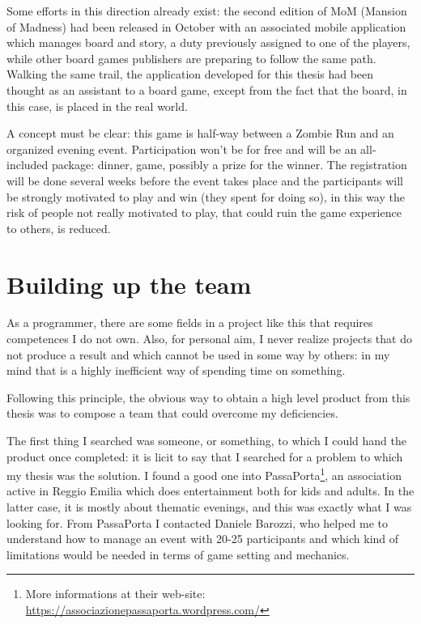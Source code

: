 		Some efforts in this direction already exist: the second edition of MoM (Mansion of Madness) had been released in October with an associated mobile application which manages board and story, a duty previously assigned to one of the players, while other board games publishers are preparing to follow the same path.
		Walking the same trail, the application developed for this thesis had been thought as an assistant to a board game, except from the fact that the board, in this case, is placed in the real world.
		
		A concept must be clear: this game is half-way between a Zombie Run and an organized evening event.
		Participation won't be for free and will be an all-included package: dinner, game, possibly a prize for the winner.
		The registration will be done several weeks before the event takes place and the participants will be strongly motivated to play and win (they spent for doing so), in this way the risk of people not really motivated to play, that could ruin the game experience to others, is reduced.
	
	\section{Building up the team}
		
		As a programmer, there are some fields in a project like this that requires competences I do not own.
		Also, for personal aim, I never realize projects that do not produce a result and which cannot be used in some way by others: in my mind that is a highly inefficient way of spending time on something.
		
		Following this principle, the obvious way to obtain a high level product from this thesis was to compose a team that could overcome my deficiencies.
		
		The first thing I searched was someone, or something, to which I could hand the product once completed: it is licit to say that I searched for a problem to which my thesis was the solution.
		I found a good one into PassaPorta\footnote{More informations at their web-site: \url{ https://associazionepassaporta.wordpress.com/}}, an association active in Reggio Emilia which does entertainment both for kids and adults.
		In the latter case, it is mostly about thematic evenings, and this was exactly what I was looking for.
		From PassaPorta I contacted Daniele Barozzi, who helped me to understand how to manage an event with 20-25 participants and which kind of limitations would be needed in terms of game setting and mechanics.
		
